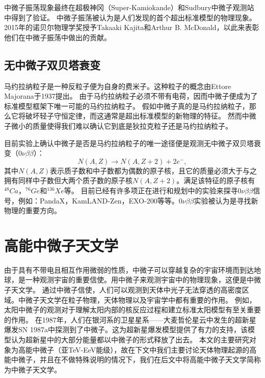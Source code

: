 中微子振荡现象最终在超极神冈（Super-Kamiokande）和Sudbury中微子观测站中得到了验证\cite{Super-K:1998, Sudbury:2001}。
中微子振荡被认为是人们发现的首个超出标准模型的物理现象。2015年的诺贝尔物理学奖授予Takaaki Kajita和Arthur B. McDonald，以此来表彰他们在中微子振荡中做出的贡献。


\subsection{无中微子双贝塔衰变}

马约拉纳粒子是一种反粒子便为自身的费米子。这种粒子的概念由Ettore Majorana于1937提出。
由于马约拉纳粒子必须不带有电荷，因而中微子便成为了标准模型框架下唯一可能的马约拉纳粒子。
假如中微子真的是马约拉纳粒子，那么它将破坏轻子守恒定律，而这通常是超出标准模型的新物理的特征。
然而中微子微小的质量使得我们难以确认它到底是狄拉克粒子还是马约拉纳粒子。

目前实验上确认中微子是否是马约拉纳粒子的唯一途径便是观测无中微子双贝塔衰变（$0\nu\beta\beta$）：
\begin{equation}
    N(A, Z) \rightarrow N(A, Z+2) +2 e^{-} ,
    \label{eq: double beta decay}
\end{equation}
其中$N(A, Z)$表示质子数和中子数都为偶数的原子核，且它的质量必须大于与之拥有同样中子数但大两个质子数的原子核$N(A, Z+2)$。满足该特征的原子核有$^{48}Ca$，$^{76}Ge$和$^{136}Xe$等。
目前已经有许多项正在进行和规划中的实验来探寻$0\nu\beta\beta$信号，例如：PandaX\cite{PandaX-II:2019}，KamLAND-Zen\cite{KamLAND-Zen:2016}，EXO-200\cite{EXO-200:2012}等等。$0\nu\beta\beta$实验被认为是寻找新物理的重要方向。


\section{高能中微子天文学}

由于具有不带电且相互作用微弱的性质，中微子可以穿越复杂的宇宙环境而到达地球，是一种观测宇宙的重要信使。用中微子来观测宇宙中的物理现象，这便是中微子天文学。
通过中微子信使，人们可以观测到天体中光子无法穿透的高密度区域。中微子天文学在粒子物理，天体物理以及宇宙学中都有重要的作用。
例如，太阳中微子的观测对于理解太阳内部的核反应过程和建立标准太阳模型有至关重要的作用\cite{Bahcall_solar_model:2005}。
在1987年，人们在银河系的卫星星系——大麦哲伦星云中发生的超新星爆发SN 1987a中探测到了中微子\cite{Hirata_sn:1987, Bionta_sn:1987}。这为超新星爆发模型提供了有力的支持，该模型认为超新星中的大部分能量都以中微子的形式释放了出去。
本文的主要研究对象为高能中微子（亚TeV-EeV能级），故在下文中我们主要讨论天体物理起源的高能中微子，并且在不做特殊说明的情况下，我们在后文中将高能中微子天文学简称为中微子天文学。

